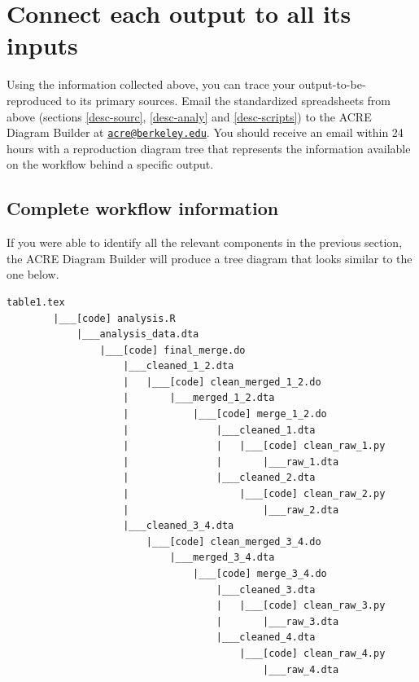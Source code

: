 \documentclass[]{book}
\begin{document}
\hypertarget{diagram}{%
\section{Connect each output to all its inputs}\label{diagram}}

Using the information collected above, you can trace your output-to-be-reproduced to its primary sources. Email the standardized spreadsheets from above (sections \ref{desc-sourc}, \ref{desc-analy} and \ref{desc-scripts}) to the ACRE Diagram Builder at \href{mailto:acre@berkeley.edu}{\nolinkurl{acre@berkeley.edu}}. You should receive an email within 24 hours with a reproduction diagram tree that represents the information available on the workflow behind a specific output.

\hypertarget{complete-workflow-information}{%
\subsection{Complete workflow information}\label{complete-workflow-information}}

If you were able to identify all the relevant components in the previous section, the ACRE Diagram Builder will produce a tree diagram that looks similar to the one below.

\begin{verbatim}
table1.tex
        |___[code] analysis.R
            |___analysis_data.dta
                |___[code] final_merge.do
                    |___cleaned_1_2.dta
                    |   |___[code] clean_merged_1_2.do
                    |       |___merged_1_2.dta
                    |           |___[code] merge_1_2.do
                    |               |___cleaned_1.dta
                    |               |   |___[code] clean_raw_1.py
                    |               |       |___raw_1.dta
                    |               |___cleaned_2.dta
                    |                   |___[code] clean_raw_2.py
                    |                       |___raw_2.dta
                    |___cleaned_3_4.dta
                        |___[code] clean_merged_3_4.do
                            |___merged_3_4.dta
                                |___[code] merge_3_4.do
                                    |___cleaned_3.dta
                                    |   |___[code] clean_raw_3.py
                                    |       |___raw_3.dta
                                    |___cleaned_4.dta
                                        |___[code] clean_raw_4.py
                                            |___raw_4.dta
\end{verbatim}
\end{document}
